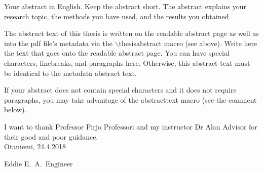 \documentclass[english,12pt,a4paper,pdftex,sci,utf8]{aaltothesis} %
\date{xx.8.2018}
\begin{document}
\makecoverpage

\makecopyrightpage


\begin{abstractpage}[english]
  Your abstract in English. Keep the abstract short. The abstract explains your
  research topic, the methods you have used, and the results you obtained.  
  
  The abstract text of this thesis is written on the readable abstract page as
  well as into the pdf file's metadata via the $\backslash$thesisabstract macro
  (see above). Write here the text that goes onto the readable abstract page.
  You can have special characters, linebreaks, and paragraphs here. Otherwise,
  this abstract text must be identical to the metadata abstract text.
  
  If your abstract does not contain special characters and it does not require
  paragraphs, you may take advantage of the abstracttext macro (see the comment
  below).
\end{abstractpage}






I want to thank Professor Pirjo Professori and my instructor Dr Alan Advisor for 
their good and poor guidance.\\

\vspace{5cm}
Otaniemi, 24.4.2018

\vspace{5mm}
{\hfill Eddie E.\ A.\ Engineer \hspace{1cm}}
\end{document}
